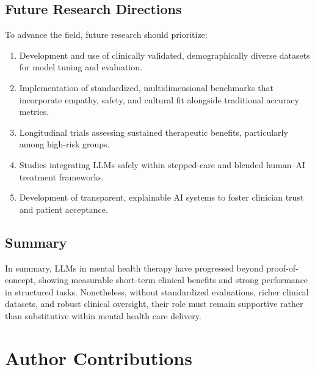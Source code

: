 \documentclass[journal]{IEEEtran}
\begin{document}
\subsection{Future Research Directions}
To advance the field, future research should prioritize:
\begin{enumerate}
\item Development and use of clinically validated, demographically diverse datasets for model tuning and evaluation.
\item Implementation of standardized, multidimensional benchmarks that incorporate empathy, safety, and cultural fit alongside traditional accuracy metrics.
\item Longitudinal trials assessing sustained therapeutic benefits, particularly among high-risk groups.
\item Studies integrating LLMs safely within stepped-care and blended human–AI treatment frameworks.
\item Development of transparent, explainable AI systems to foster clinician trust and patient acceptance.
\end{enumerate}

\subsection{Summary}
In summary, LLMs in mental health therapy have progressed beyond proof-of-concept, showing measurable short-term clinical benefits and strong performance in structured tasks. Nonetheless, without standardized evaluations, richer clinical datasets, and robust clinical oversight, their role must remain supportive rather than substitutive within mental health care delivery.

\section*{Author Contributions}
\end{document}
